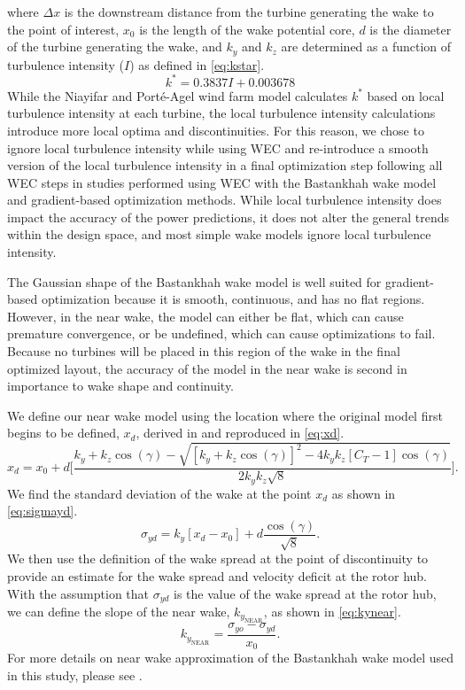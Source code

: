 \documentclass[journal abbreviation, manuscript]{copernicus}
\begin{document}
	where $\Delta x$ is the downstream distance from the turbine generating the wake to the point of interest, $x_0$ is the length of the wake potential core, $d$ is the diameter of the turbine generating the wake, and $k_y$ and $k_z$ are determined as a function of turbulence intensity ($I$) as defined in \ref{eq:kstar}\cite{niayifar2016}.
	\begin{equation}\label{eq:kstar}
		k^* = 0.3837I + 0.003678
	\end{equation}
	While the Niayifar and Port\'e-Agel wind farm model calculates $k^*$ based on local turbulence intensity at each turbine, the local turbulence intensity calculations introduce more local optima and discontinuities. For this reason, we chose to ignore local turbulence intensity while using WEC and re-introduce a smooth version of the local turbulence intensity in a final optimization step following all WEC steps in studies performed using WEC with the Bastankhah wake model and gradient-based optimization methods. While local turbulence intensity does impact the accuracy of the power predictions, it does not alter the general trends within the design space, and most simple wake models ignore local turbulence intensity. 
	
	The Gaussian shape of the Bastankhah wake model is well suited for gradient-based optimization because it is smooth, continuous, and has no flat regions. However, in the near wake, the model can either be flat, which can cause premature convergence, or be undefined, which can cause optimizations to fail. Because no turbines will be placed in this region of the wake in the final optimized layout, the accuracy of the model in the near wake is second in importance to wake shape and continuity. 
	
	We define our near wake model using the location where the original model first begins to be defined, $x_d$, derived in \cite{thomas2019-les-validation} and reproduced in \ref{eq:xd}.
	\begin{equation}\label{eq:xd}
		x_d = x_0 +d \Bigg[ \frac{k_y+k_z\cos{(\gamma)} - \sqrt{[k_y+k_z\cos{(\gamma)}]^2-4k_y k_z[C_T-1]\cos{(\gamma)}}}{2k_y k_z\sqrt{8}}\Bigg].
	\end{equation}
	We find the standard deviation of the wake at the point $x_d$ as shown in \ref{eq:sigmayd}.
	\begin{equation}\label{eq:sigmayd}
		\sigma_{yd} = k_y [x_d - x_0] + d\frac{\cos{(\gamma)}}{\sqrt{8}}.
	\end{equation}
	We then use the definition of the wake spread at the point of discontinuity to provide an estimate for the wake spread and velocity deficit at the rotor hub. With the assumption that $\sigma_{yd}$ is the value of the wake spread at the rotor hub, we can define the slope of the near wake, $k_{y_{\text{NEAR}}}$, as shown in \ref{eq:kynear}.
	\begin{equation}\label{eq:kynear}
		k_{y_{\text{NEAR}}} = \frac{\sigma_{yo}-\sigma_{yd}}{x_0}.
	\end{equation}
	For more details on near wake approximation of the Bastankhah wake model used in this study, please see \cite{thomas2019-les-validation}.
	
\end{document}
